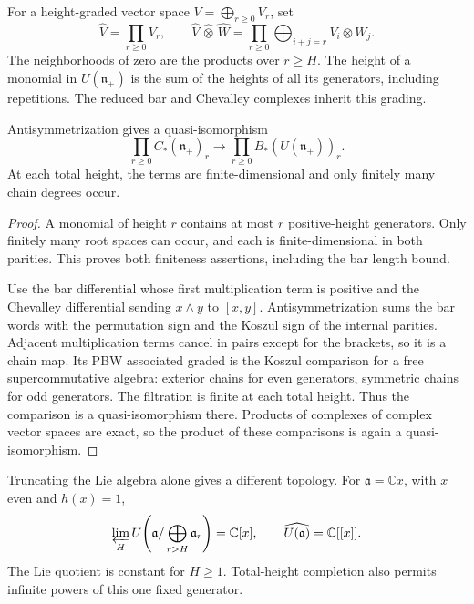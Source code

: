 For a height-graded vector space \(V=\bigoplus_{r\geq0}V_r\),
set
\[
 \widehat V=\prod_{r\geq0}V_r,\qquad
 \widehat V\,\widehat\otimes\,\widehat W
 =\prod_{r\geq0}\bigoplus_{i+j=r}V_i\otimes W_j.
\]
The neighborhoods of zero are the products over \(r\geq H\).
The height of a monomial in \(U(\mathfrak n_+)\) is the
sum of the heights of all its generators, including repetitions.
The reduced bar and Chevalley complexes inherit this grading.

\begin{theorem}\label{cyidx:thm:completed-bar}
Antisymmetrization gives a quasi-isomorphism
\begin{equation}\label{cyidx:eq:completed-bar}
 \prod_{r\geq0}C_*(\mathfrak n_+)_r
 \longrightarrow
 \prod_{r\geq0}B_*(U(\mathfrak n_+))_r.
\end{equation}
At each total height, the terms are finite-dimensional and
only finitely many chain degrees occur.
\end{theorem}
\begin{proof}
A monomial of height \(r\) contains at most \(r\)
positive-height generators. Only finitely many root spaces
can occur, and each is finite-dimensional in both parities.
This proves both finiteness assertions, including the bar
length bound.

Use the bar differential whose first multiplication term
is positive and the Chevalley differential sending
\(x\wedge y\) to \([x,y]\). Antisymmetrization sums the
bar words with the permutation sign and the Koszul sign
of the internal parities. Adjacent multiplication terms
cancel in pairs except for the brackets, so it is a chain
map. Its PBW associated graded is the Koszul comparison
for a free supercommutative algebra: exterior chains for
even generators, symmetric chains for odd generators.
The filtration is finite at each total height.
Thus the comparison is a quasi-isomorphism there.
Products of complexes of complex vector spaces are exact,
so the product of these comparisons is again a
quasi-isomorphism.
\end{proof}

Truncating the Lie algebra alone gives a different topology.
For \(\mathfrak a=\mathbb Cx\), with \(x\) even and \(h(x)=1\),
\begin{equation}\label{cyidx:eq:completion-test}
 \varprojlim_H U\!\left(\mathfrak a/
                       \bigoplus_{r>H}\mathfrak a_r\right)
       =\mathbb C[x],\qquad
 \widehat{U(\mathfrak a)}=\mathbb C[[x]].
\end{equation}
The Lie quotient is constant for \(H\geq1\).
Total-height completion also permits infinite powers
of this one fixed generator.

